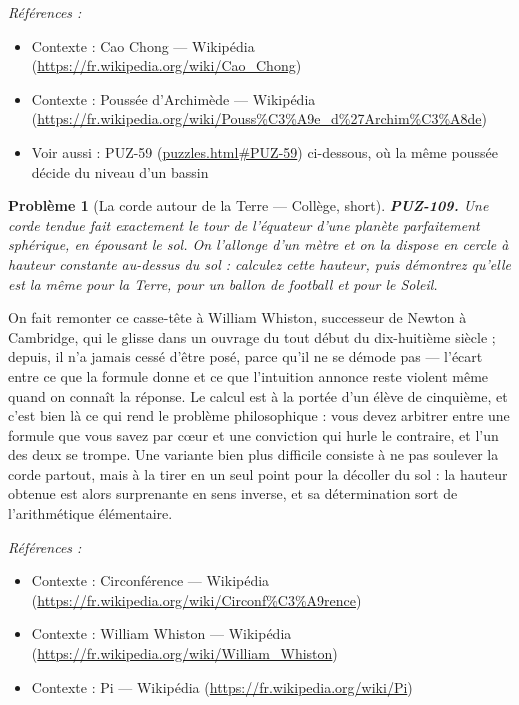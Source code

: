 \documentclass[11pt]{article}
\newtheorem{problem}{Problème}
\newenvironment{refs}{\par\small\noindent\emph{Références :}\begin{itemize}\setlength\itemsep{0pt}}{\end{itemize}\normalsize}
\begin{document}
\begin{refs}
\item Contexte : Cao Chong --- Wikipédia (\url{https://fr.wikipedia.org/wiki/Cao_Chong})
\item Contexte : Poussée d'Archimède --- Wikipédia (\url{https://fr.wikipedia.org/wiki/Pouss%C3%A9e_d%27Archim%C3%A8de})
\item Voir aussi : PUZ-59 (\url{puzzles.html#PUZ-59}) ci-dessous, où la même poussée décide du niveau d'un bassin
\end{refs}

\bigskip

\begin{problem}[{La corde autour de la Terre --- Collège, short}]
\textbf{PUZ-109.} Une corde tendue fait exactement le tour de l'équateur
d'une planète parfaitement sphérique, en épousant le sol. On l'allonge d'un mètre et on la
dispose en cercle à hauteur constante au-dessus du sol : calculez cette hauteur, puis
démontrez qu'elle est la même pour la Terre, pour un ballon de football et pour le Soleil.
\end{problem}

\noindent On fait remonter ce casse-tête à William Whiston, successeur de Newton à
Cambridge, qui le glisse dans un ouvrage du tout début du dix-huitième siècle ; depuis, il
n'a jamais cessé d'être posé, parce qu'il ne se démode pas --- l'écart entre ce que la formule
donne et ce que l'intuition annonce reste violent même quand on connaît la réponse. Le calcul
est à la portée d'un élève de cinquième, et c'est bien là ce qui rend le problème
philosophique : vous devez arbitrer entre une formule que vous savez par c\oe{}ur et une
conviction qui hurle le contraire, et l'un des deux se trompe. Une variante bien plus
difficile consiste à ne pas soulever la corde partout, mais à la tirer en un seul point pour
la décoller du sol : la hauteur obtenue est alors surprenante en sens inverse, et sa
détermination sort de l'arithmétique élémentaire.

\begin{refs}
\item Contexte : Circonférence --- Wikipédia (\url{https://fr.wikipedia.org/wiki/Circonf%C3%A9rence})
\item Contexte : William Whiston --- Wikipédia (\url{https://fr.wikipedia.org/wiki/William_Whiston})
\item Contexte : Pi --- Wikipédia (\url{https://fr.wikipedia.org/wiki/Pi})
\end{refs}
\end{document}
